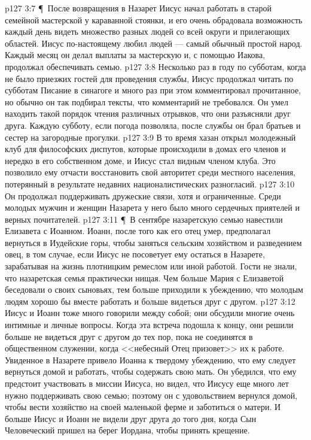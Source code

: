 \vs p127 3:7 \P\ После возвращения в Назарет Иисус начал работать в старой семейной мастерской у караванной стоянки, и его очень обрадовала возможность каждый день видеть множество разных людей со всей округи и прилегающих областей. Иисус по\hyp{}настоящему любил людей --- самый обычный простой народ. Каждый месяц он делал выплаты за мастерскую и, с помощью Иакова, продолжал обеспечивать семью.
\vs p127 3:8 Несколько раз в году по субботам, когда не было приезжих гостей для проведения службы, Иисус продолжал читать по субботам Писание в синагоге и много раз при этом комментировал прочитанное, но обычно он так подбирал тексты, что комментарий не требовался. Он умел находить такой порядок чтения различных отрывков, что они разъясняли друг друга. Каждую субботу, если погода позволяла, после службы он брал братьев и сестер на загородные прогулки.
\vs p127 3:9 В то время хазан открыл молодежный клуб для философских диспутов, которые происходили в домах его членов и нередко в его собственном доме, и Иисус стал видным членом клуба. Это позволило ему отчасти восстановить свой авторитет среди местного населения, потерянный в результате недавних националистических разногласий.
\vs p127 3:10 Он продолжал поддерживать дружеские связи, хотя и ограниченные. Среди молодых мужчин и женщин Назарета у него было много сердечных приятелей и верных почитателей.
\vs p127 3:11 \P\ В сентябре назаретскую семью навестили Елизавета с Иоанном. Иоанн, после того как его отец умер, предполагал вернуться в Иудейские горы, чтобы заняться сельским хозяйством и разведением овец, в том случае, если Иисус не посоветует ему остаться в Назарете, зарабатывая на жизнь плотницким ремеслом или иной работой. Гости не знали, что назаретская семья практически нищая. Чем больше Мария с Елизаветой беседовали о своих сыновьях, тем больше приходили к убеждению, что молодым людям хорошо бы вместе работать и больше видеться друг с другом.
\vs p127 3:12 Иисус и Иоанн тоже много говорили между собой; они обсудили многие очень интимные и личные вопросы. Когда эта встреча подошла к концу, они решили больше не видеться друг с другом до тех пор, пока не соединятся в общественном служении, когда <<небесный Отец призовет>> их к работе. Увиденное в Назарете привело Иоанна к твердому убеждению, что ему следует вернуться домой и работать, чтобы содержать свою мать. Он убедился, что ему предстоит участвовать в миссии Иисуса, но видел, что Иисусу еще много лет нужно поддерживать свою семью; поэтому он с удовольствием вернулся домой, чтобы вести хозяйство на своей маленькой ферме и заботиться о матери. И больше Иисус и Иоанн не видели друг друга до того дня, когда Сын Человеческий пришел на берег Иордана, чтобы принять крещение.
